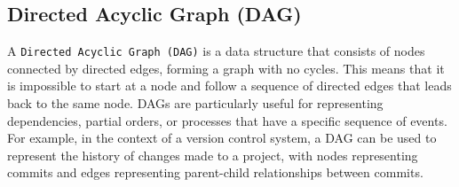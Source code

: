\subsection{Directed Acyclic Graph (DAG)}

A \lstinline{Directed Acyclic Graph (DAG)} is a data structure that consists of nodes connected by directed edges, forming a graph with no cycles. This means that it is impossible to start at a node and follow a sequence of directed edges that leads back to the same node. DAGs are particularly useful for representing dependencies, partial orders, or processes that have a specific sequence of events. For example, in the context of a version control system, a DAG can be used to represent the history of changes made to a project, with nodes representing commits and edges representing parent-child relationships between commits.



